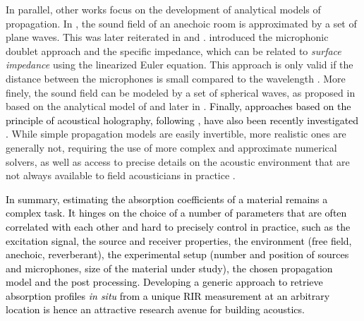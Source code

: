 \documentclass[reprint]{JASA}
\begin{document}
In parallel, other works focus on the development of analytical models of propagation. In \cite{Ingard1951}, the sound field of an anechoic room is approximated by a set of plane waves. This was later reiterated in \cite{Ando1968} and \cite{Sides1971}. \cite{Allard1985a} introduced the microphonic doublet approach and the specific impedance, which can be related to \textit{surface impedance} using the linearized Euler equation. This approach is only valid if the distance between the microphones is small compared to the wavelength \cite{Allard1985b,Minten1988,Champoux1988a,Champoux1988b}. More finely, the sound field can be modeled by a set of spherical waves, as proposed in \cite{Champoux1988a} based on the analytical model of \cite{Nobile1985} and later in \cite{Li1997}. \textcolor{black}{Finally, approaches based on the principle of acoustical holography, following \cite{tamura1990spatial}, have also been recently investigated \cite{rathsam2015analysis,richard2017estimation,nolan2020estimation}.}
While simple propagation models are easily invertible, more realistic ones are generally not, requiring the use of more complex and approximate numerical solvers, as well as access to precise details on the acoustic environment that are not always available to field acousticians in practice \cite{Brandao2015l}. 

\textcolor{black}{In summary, estimating the absorption coefficients of a material remains a complex task. It hinges on the choice of a number of parameters that are often correlated with each other and hard to precisely control in practice, such as the excitation signal, the source and receiver properties, the environment (free field, anechoic, reverberant), the experimental setup (number and position of sources and microphones, size of the material under study), the chosen propagation model and the post processing. Developing a generic approach to retrieve absorption profiles \textit{in situ} from a unique RIR measurement at an arbitrary location is hence an attractive research avenue for building acoustics.}
\end{document}
